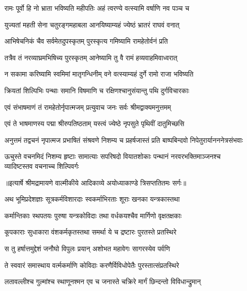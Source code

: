 \twolineshloka
{रामः पूर्वो हि नो भ्राता भविष्यति महीपतिः}
{अहं त्वरण्ये वत्स्यामि वर्षाणि नव पञ्च च} %

\twolineshloka
{युज्यतां महती सेना चतुरङ्गमहाबला}
{आनयिष्याम्यहं ज्येष्ठं भ्रातरं राघवं वनात्} %

\twolineshloka
{आभिषेचनिकं चैव सर्वमेतदुपस्कृतम्}
{पुरस्कृत्य गमिष्यामि रामहेतोर्वनं प्रति} %

\twolineshloka
{तत्रैव तं नरव्याघ्रमभिषिच्य पुरस्कृतम्}
{आनेष्यामि तु वै रामं हव्यवाहमिवाध्वरात्} %

\twolineshloka
{न सकामा करिष्यामि स्वमिमां मातृगन्धिनीम्}
{वने वत्स्याम्यहं दुर्गे रामो राजा भविष्यति} %

\twolineshloka
{क्रियतां शिल्पिभिः पन्थाः समानि विषमाणि च}
{रक्षिणश्चानुसंयान्तु पथि दुर्गविचारकाः} %

\twolineshloka
{एवं संभाषमाणं तं रामहेतोर्नृपात्मजम्}
{प्रत्युवाच जनः सर्वः श्रीमद्वाक्यमनुत्तमम्} %

\twolineshloka
{एवं ते भाषमाणस्य पद्मा श्रीरुपतिष्ठताम्}
{यस्त्वं ज्येष्ठे नृपसुते पृथिवीं दातुमिच्छसि} %

\fourlineindentedshloka
{अनुत्तमं तद्वचनं नृपात्मज}
{ प्रभाषितं संश्रवणे निशम्य च}
{प्रहर्षजास्तं प्रति बाष्पबिन्दवो}
{ निपेतुरार्यानननेत्रसंभवाः} %

\fourlineindentedshloka
{ऊचुस्ते वचनमिदं निशम्य हृष्टाः}
{ सामात्याः सपरिषदो वियातशोकाः}
{पन्थानं नरवरभक्तिमाञ्जनश्च}
{ व्यादिष्टस्तव वचनाच्च शिल्पिवर्गः} %


{॥इत्यार्षे श्रीमद्रामायणे वाल्मीकीये आदिकाव्ये अयोध्याकाण्डे त्रिसप्ततितमः सर्गः॥}


\twolineshloka
{अथ भूमिप्रदेशज्ञाः सूत्रकर्मविशारदाः}
{स्वकर्माभिरताः शूराः खनका यन्त्रकास्तथा} %

\twolineshloka
{कर्मान्तिकाः स्थपतयः पुरुषा यन्त्रकोविदाः}
{तथा वर्धकयश्चैव मार्गिणो वृक्षतक्षकाः} %

\twolineshloka
{कूपकाराः सुधाकारा वंशकर्मकृतस्तथा}
{समर्था ये च द्रष्टारः पुरतस्ते प्रतस्थिरे} %

\twolineshloka
{स तु हर्षात्तमुद्देशं जनौघो विपुलः प्रयान्}
{अशोभत महावेगः सागरस्येव पर्वणि} %

\twolineshloka
{ते स्ववारं समास्थाय वर्त्मकर्माणि कोविदाः}
{करणैर्विविधोपेतैः पुरस्तात्संप्रतस्थिरे} %

\twolineshloka
{लतावल्लीश्च गुल्मांश्च स्थाणूनश्मन एव च}
{जनास्ते चक्रिरे मार्गं छिन्दन्तो विविधान्द्रुमान्} %

